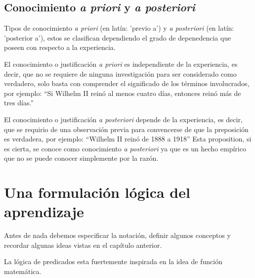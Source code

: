 \documentclass[12 pt, a4paper]{article}
\begin{document}
			
			
		\subsection{Conocimiento \emph{a priori} y \emph{a posteriori}}
			Tipos de conocimiento \emph{a priori} (en latín: 'previo a') y \emph{a posteriori} (en latín: 'posterior a'), estos se clasifican dependiendo el grado de depenedencia que poseen con respecto a la experiencia.
			
			El conocimiento o justificación \emph{a priori} es independiente de la experiencia, es decir, que no se requiere de ninguna investigación para ser considerado como verdadero, solo basta con comprender el significado de los términos involucrados, por ejemplo: ``Si Wilhelm II reinó al menos cuatro días, entonces reinó más de tres días.''  
			
			El conocimiento o justificación \emph{a posteriori} depende de la experiencia, es decir, que se requirio de una observación previa para convencerse de que la preposición es verdadera, por ejemplo: ``Wilhelm II reinó de 1888 a 1918'' Esta proposition, si es cierta, se conoce como conocimiento \emph{a posteriori} ya que es un hecho empírico que no se puede conocer simplemente por la razón. 
				 
	\section{Una formulación lógica del aprendizaje}
	
		Antes de nada debemos especificar la notación, definir algunos conceptos y recordar algunas ideas vistas en el capítulo anterior.
		
		La lógica de predicados esta fuertemente inspirada en la idea de función matemática.
		
\end{document}
